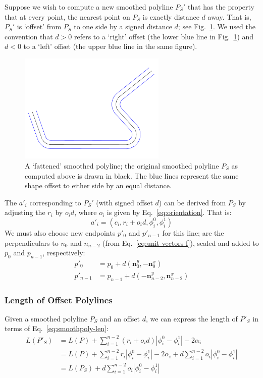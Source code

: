 \documentclass{article}
\begin{document}
Suppose we wish to compute a new smoothed polyline $P_S'$ that has the property that at every point, the nearest point on $P_S$ is exactly distance $d$ away.  That is, $P_S'$ is `offset' from $P_S$ to one side by a signed distance $d$; see Fig.~\ref{fig:fattened-polyline}.  We used the convention that $d>0$ refers to a `right' offset (the lower blue line in Fig.~\ref{fig:fattened-polyline}) and $d<0$ to a `left' offset (the upper blue line in the same figure).
%
\begin{figure}[h]
  \centering
  \includegraphics[width=7cm]{5}
  \caption{A `fattened' smoothed polyline; the original smoothed polyline $P_S$ as computed above is drawn in black.  The blue lines represent the same shape offset to either side by an equal distance.}
  \label{fig:fattened-polyline}
\end{figure}
%
The $a'_i$ corresponding to $P_S'$ (with signed offset $d$) can be derived from $P_S$ by adjusting the $r_i$ by $o_id$, where $o_i$ is given by Eq.~\eqref{eq:orientation}.  That is:
%
\begin{equation}
  \label{eq:arc-offset}
  a'_i = \left(c_i, r_i + o_id, \phi^0_i, \phi^1_i\right)
\end{equation}
%
We must also choose new endpoints $p'_0$ and $p'_{n-1}$ for this line;  are the perpendiculars to $n_0$ and $n_{n-2}$ (from Eq.~\eqref{eq:unit-vectors-f}), scaled and added to $p_0$ and $p_{n-1}$, respectively:
%
\begin{align}
  \label{eq:endpoints-prime}
  p'_0 &= p_0 + d \left(\mathbf{n}_0^y, -\mathbf{n}_0^x\right)\\
  p'_{n-1} &= p_{n-1} + d \left(-\mathbf{n}_{n-2}^y, \mathbf{n}_{n-2}^x\right)
\end{align}
%
\subsubsection{Length of Offset Polylines}
%
Given a smoothed polyline $P_S$ and an offset $d$, we can express the length of $P'_S$ in terms of Eq.~\eqref{eq:smoothpoly-len}:
%
\begin{align}
  L\left(P'_S\right) &= L\left(P\right) + \sum^{n-2}_{i = 1} \left(r_i + o_id\right)\left|\phi^0_i - \phi^1_i\right| - 2\alpha_i\\
  &= L\left(P\right) + \sum^{n-2}_{i = 1} r_i\left|\phi^0_i - \phi^1_i\right| - 2\alpha_i + d\sum^{n-2}_{i = 1}  o_i\left|\phi^0_i - \phi^1_i\right|\\
  &= L\left(P_S\right) + d\sum^{n-2}_{i = 1}  o_i\left|\phi^0_i - \phi^1_i\right|
\end{align}
%
\end{document}
